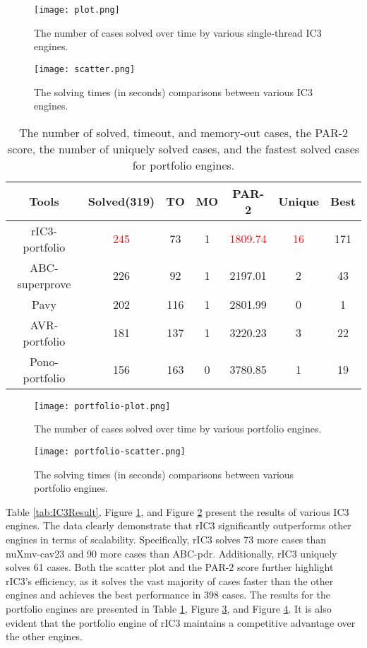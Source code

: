 \documentclass[runningheads]{llncs}
\begin{document}
\begin{figure}[!t]
    \centering
    \texttt{[image: plot.png]}
    \caption{The number of cases solved over time by various single-thread IC3 engines.}
    \label{fig:Plot}
\end{figure}

\begin{figure}[!t]
    \centering
    \texttt{[image: scatter.png]}
    \caption{The solving times (in seconds) comparisons between various IC3 engines.}
    \label{fig:Scatter}
\end{figure}

\begin{table}[!t]
\centering
\setlength{\tabcolsep}{9pt}
\caption{The number of solved, timeout, and memory-out cases, the PAR-2 score, the number of uniquely solved cases, and the fastest solved cases for portfolio engines.}
\label{tab:PortfolioResult}
\begin{tabular}{c c c c c c c}
\hline
Tools & Solved(319) & TO & MO & PAR-2 & Unique & Best \\
\hline
rIC3-portfolio & \textcolor{red}{245} & 73 & 1 & \textcolor{red}{1809.74} & \textcolor{red}{16} & 171\\
ABC-superprove & 226 & 92 & 1 & 2197.01 & 2 & 43 \\ 
Pavy\footnotemark[2] & 202 & 116 & 1 & 2801.99 & 0 & 1 \\
AVR-portfolio & 181 & 137 & 1 & 3220.23 & 3 & 22 \\
Pono-portfolio & 156 & 163 & 0 & 3780.85 & 1 & 19\\
\hline
\end{tabular}
\end{table}

\begin{figure}[!t]
    \centering
    \texttt{[image: portfolio-plot.png]}
    \caption{The number of cases solved over time by various portfolio engines.}
    \label{fig:Portfolio-Plot}
\end{figure}

\begin{figure}[!t]
    \centering
    \texttt{[image: portfolio-scatter.png]}
    \caption{The solving times (in seconds) comparisons between various portfolio engines.}
    \label{fig:Portfolio-Scatter}
\end{figure}

Table \ref{tab:IC3Result}, Figure \ref{fig:Plot}, and Figure \ref{fig:Scatter} present the results of various IC3 engines. The data clearly demonstrate that rIC3 significantly outperforms other engines in terms of scalability. Specifically, rIC3 solves 73 more cases than nuXmv-cav23 and 90 more cases than ABC-pdr. Additionally, rIC3 uniquely solves 61 cases. Both the scatter plot and the PAR-2 score further highlight rIC3’s efficiency, as it solves the vast majority of cases faster than the other engines and achieves the best performance in 398 cases. The results for the portfolio engines are presented in Table \ref{tab:PortfolioResult}, Figure \ref{fig:Portfolio-Plot}, and Figure \ref{fig:Portfolio-Scatter}. It is also evident that the portfolio engine of rIC3 maintains a competitive advantage over the other engines.
\end{document}
